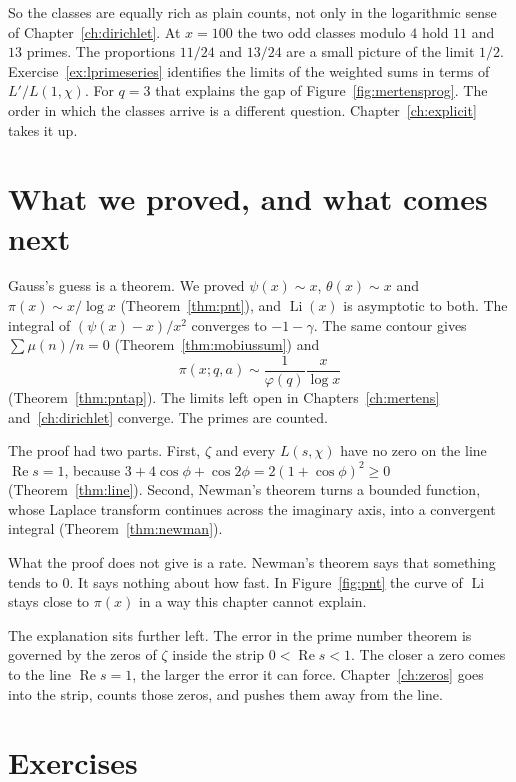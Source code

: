 So the classes are equally rich as plain counts, not only in the logarithmic sense of Chapter~\ref{ch:dirichlet}. At $x=100$ the two odd classes modulo $4$ hold $11$ and $13$ primes. The proportions $11/24$ and $13/24$ are a small picture of the limit $1/2$. Exercise~\ref{ex:lprimeseries} identifies the limits of the weighted sums in terms of $L'/L(1,\chi)$. For $q=3$ that explains the gap of Figure~\ref{fig:mertensprog}. The order in which the classes arrive is a different question. Chapter~\ref{ch:explicit} takes it up.

\section{What we proved, and what comes next}

Gauss's guess is a theorem. We proved $\psi(x)\sim x$, $\theta(x)\sim x$ and $\pi(x)\sim x/\log x$ (Theorem~\ref{thm:pnt}), and $\operatorname{Li}(x)$ is asymptotic to both. The integral of $(\psi(x)-x)/x^2$ converges to $-1-\gamma$. The same contour gives $\sum\mu(n)/n=0$ (Theorem~\ref{thm:mobiussum}) and
\[
\pi(x;q,a)\sim\frac1{\varphi(q)}\frac x{\log x}
\]
(Theorem~\ref{thm:pntap}). The limits left open in Chapters~\ref{ch:mertens} and~\ref{ch:dirichlet} converge. The primes are counted.

The proof had two parts. First, $\zeta$ and every $L(s,\chi)$ have no zero on the line $\operatorname{Re}s=1$, because $3+4\cos\phi+\cos2\phi=2(1+\cos\phi)^2\ge0$ (Theorem~\ref{thm:line}). Second, Newman's theorem turns a bounded function, whose Laplace transform continues across the imaginary axis, into a convergent integral (Theorem~\ref{thm:newman}).

What the proof does not give is a rate. Newman's theorem says that something tends to $0$. It says nothing about how fast. In Figure~\ref{fig:pnt} the curve of $\operatorname{Li}$ stays close to $\pi(x)$ in a way this chapter cannot explain.

The explanation sits further left. The error in the prime number theorem is governed by the zeros of $\zeta$ inside the strip $0<\operatorname{Re}s<1$. The closer a zero comes to the line $\operatorname{Re}s=1$, the larger the error it can force. Chapter~\ref{ch:zeros} goes into the strip, counts those zeros, and pushes them away from the line.

\section{Exercises}

